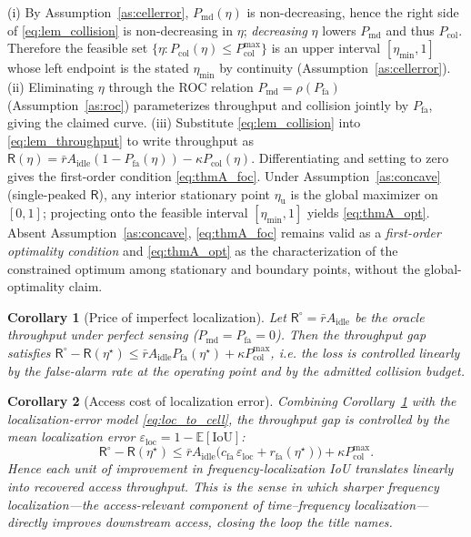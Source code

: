 \documentclass[journal]{IEEEtran}
\newtheorem{corollary}{Corollary}
\newcommand{\E}{\mathbb{E}}
\newcommand{\Pmd}{P_{\mathrm{md}}}         %
\newcommand{\Pfa}{P_{\mathrm{fa}}}         %
\newcommand{\thr}{\eta}                    %
\newcommand{\Pcol}{P_{\mathrm{col}}}       %
\newcommand{\Pcolmax}{P_{\mathrm{col}}^{\max}} %
\newcommand{\thru}{\mathsf{R}}             %
\newcommand{\iou}{\mathrm{IoU}}
\newcommand{\eloc}{\varepsilon_{\mathrm{loc}}}
\newcommand{\cfa}{c_{\mathrm{fa}}}
\newcommand{\rfa}{r_{\mathrm{fa}}}
\begin{document}
\begin{IEEEproof}
(i) By Assumption~\ref{as:cellerror}, $\Pmd(\thr)$ is non-decreasing, hence
the right side of \eqref{eq:lem_collision} is non-decreasing in $\thr$;
\emph{decreasing} $\thr$ lowers $\Pmd$ and thus $\Pcol$. Therefore the
feasible set $\{\thr:\Pcol(\thr)\le\Pcolmax\}$ is an upper interval
$[\thr_{\min},1]$ whose left endpoint is the stated $\thr_{\min}$ by
continuity (Assumption~\ref{as:cellerror}).
(ii) Eliminating $\thr$ through the ROC relation $\Pmd=\rho(\Pfa)$
(Assumption~\ref{as:roc}) parameterizes throughput and collision jointly by
$\Pfa$, giving the claimed curve.
(iii) Substitute \eqref{eq:lem_collision} into \eqref{eq:lem_throughput} to
write throughput as $\thru(\thr)=\bar r A_{\mathrm{idle}}(1-\Pfa(\thr))
-\kappa\Pcol(\thr)$. Differentiating and setting to zero gives the
first-order condition \eqref{eq:thmA_foc}. Under
Assumption~\ref{as:concave} (single-peaked $\thru$), any interior stationary
point $\thr_{\mathrm u}$ is the global maximizer on $[0,1]$; projecting onto
the feasible interval $[\thr_{\min},1]$ yields \eqref{eq:thmA_opt}. Absent
Assumption~\ref{as:concave}, \eqref{eq:thmA_foc} remains valid as a
\emph{first-order optimality condition} and \eqref{eq:thmA_opt} as the
characterization of the constrained optimum among stationary and boundary
points, without the global-optimality claim.
\end{IEEEproof}

\begin{corollary}[Price of imperfect localization]
\label{cor:price}
Let $\thru^{\circ}=\bar r A_{\mathrm{idle}}$ be the oracle throughput under
perfect sensing ($\Pmd=\Pfa=0$). Then the throughput gap satisfies
$\thru^{\circ}-\thru(\thr^{\star})\le
\bar r A_{\mathrm{idle}}\Pfa(\thr^{\star})+\kappa\Pcolmax$, i.e. the loss is
controlled linearly by the false-alarm rate at the operating point and by
the admitted collision budget.
\end{corollary}

\begin{corollary}[Access cost of localization error]
\label{cor:loc}
Combining Corollary~\ref{cor:price} with the localization-error model
\eqref{eq:loc_to_cell}, the throughput gap is controlled by the mean
localization error $\eloc=1-\E[\iou]$:
\begin{equation}
\thru^{\circ}-\thru(\thr^{\star})\le
\bar r A_{\mathrm{idle}}\bigl(\cfa\,\eloc+\rfa(\thr^{\star})\bigr)
+\kappa\Pcolmax .
\label{eq:loc_gap}
\end{equation}
Hence each unit of improvement in frequency-localization IoU translates
linearly into recovered access throughput. This is the sense in which sharper
frequency localization---the access-relevant component of time--frequency
localization---directly improves downstream access, closing the loop the
title names.
\end{corollary}
\end{document}
